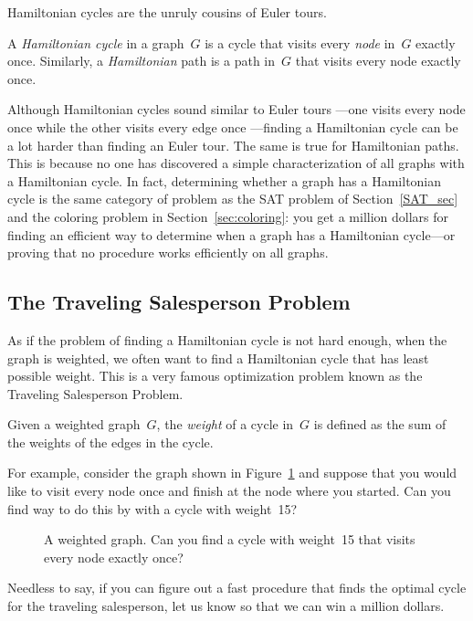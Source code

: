 \begin{editingnotes}
Hamiltonian cycles are the unruly cousins of Euler tours.

\begin{definition}\label{def:hamiltonian-cycle}
A \emph{Hamiltonian cycle} in a graph~$G$ is a cycle that visits every
\emph{node} in~$G$ exactly once.  Similarly, a \emph{Hamiltonian} path
is a path in~$G$ that visits every node exactly once.
\end{definition}

Although Hamiltonian cycles sound similar to Euler tours ---one visits
every node once while the other visits every edge once ---finding a
Hamiltonian cycle can be a lot harder than finding an Euler tour.  The
same is true for Hamiltonian paths.  This is because no one has
discovered a simple characterization of all graphs with a Hamiltonian
cycle.  In fact, determining whether a graph has a Hamiltonian cycle
is the same category of problem as the SAT problem of
Section~\ref{SAT_sec} and the coloring problem in
Section~\ref{sec:coloring}: you get a million dollars for finding an
efficient way to determine when a graph has a Hamiltonian cycle---or
proving that no procedure works efficiently on all graphs.

\subsection{The Traveling Salesperson Problem}

As if the problem of finding a Hamiltonian cycle is not hard enough,
when the graph is weighted, we often want to find a Hamiltonian cycle
that has least possible weight.  This is a very famous optimization
problem known as the Traveling Salesperson Problem.

\begin{definition}
Given a weighted graph~$G$, the \emph{weight} of a cycle in~$G$ is
defined as the sum of the weights of the edges in the cycle.
\end{definition}

For example, consider the graph shown in Figure~\ref{fig:5AL} and
suppose that you would like to visit every node once and finish at the
node where you started.  Can you find  way to do this by with a
cycle with weight~15?

\begin{figure}


\caption{A weighted graph.  Can you find a cycle with weight~15 that
  visits every node exactly once?}

\label{fig:5AL}
\end{figure}

Needless to say, if you can figure out a fast procedure that finds the
optimal cycle for the traveling salesperson, let us know so that we
can win a million dollars.
\end{editingnotes}

